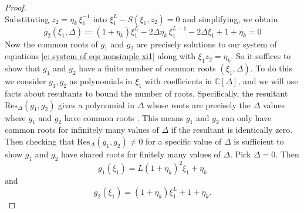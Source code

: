 \documentclass[a4paper,11pt]{article}
\theoremstyle{definition}
\begin{document}
\begin{proof}
\begin{equation}
\end{equation}
Substituting $z_2 = \eta_k \,\xi_1^{-1}$ into $\xi_1^L-S(\xi_1,z_2)=0$ and simplifying, we obtain 
\begin{equation}
    g_2(\xi_1,\Delta) \coloneq (1+\eta_k)\xi_1^L -2\Delta\eta_k \,\xi_1^{L-1}-2\Delta \xi_1 +1+\eta_k=0 
\end{equation}
Now the common roots of $g_1$ and $g_2$ are precisely solutions to our system of equations \eqref{e: system of eqs nonsimple xi1} along with $\xi_1 z_2=\eta_k$. So it suffices to show that $g_1$ and $g_2$ have a finite number of common roots $(\xi_1,\Delta)$. To do this we consider $g_1,g_2$ as polynomials in $\xi_1$ with coefficients in $\mathbb{C}[\Delta]$, and we will use facts about resultants to bound the number of roots. Specifically, the resultant $\text{Res}_\Delta(g_1,g_2)$ gives a polynomial in $\Delta$ whose roots are precisely the $\Delta$ values where $g_1$ and $g_2$ have common roots \cite{Cox_Little_OShea_1998}. This means $g_1$ and $g_2$ can only have common roots for infinitely many values of $\Delta$ if the resultant is identically zero. Then checking that $\text{Res}_\Delta(g_1,g_2)\neq 0$ for a specific value of $\Delta$ is sufficient to show $g_1$ and $g_2$ have shared roots for finitely many values of $\Delta$. Pick $\Delta=0$. Then 
\begin{equation}
    g_1(\xi_1) = L(1+\eta_k)^2\xi_1 + \eta_k
\end{equation}
and 
\begin{equation}
    g_2(\xi_1) = (1+\eta_k)\xi_1^L+1+\eta_k.
\end{equation}


\end{proof}
\end{document}
